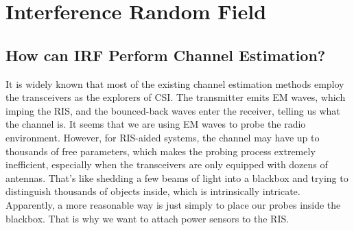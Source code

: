 \documentclass[12pt,draftclsnofoot,journal,onecolumn]{IEEEtran}
\theoremstyle{nonumberplain}
\begin{document}
\section{Interference Random Field}
\label{Interference Random Field}
\subsection{How can IRF Perform Channel Estimation?}
    It is widely known that most of the existing channel estimation methods employ the transceivers as the explorers of CSI. The transmitter emits EM waves, which imping the RIS, and the bounced-back waves enter the receiver, telling us what the channel is. It seems that we are using EM waves to probe the radio environment. However, for RIS-aided systems, the channel may have up to thousands of free parameters, which makes the probing process extremely inefficient, especially when the transceivers are only equipped with dozens of antennas. That's like shedding a few beams of light into a blackbox and trying to distinguish thousands of objects inside, which is intrinsically intricate. Apparently, a more reasonable way is just simply to place our probes inside the blackbox. That is why we want to attach power sensors to the RIS. 
\end{document}
